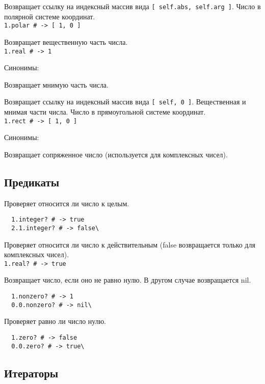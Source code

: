 \begin{methodlist}
  Возвращает ссылку на индексный массив вида \verb![ self.abs, self.arg ]!. Число в полярной системе координат.
  \\\verb!1.polar # -> [ 1, 0 ]!

  Возвращает вещественную часть числа.
  \\\verb!1.real # -> 1!

  Синонимы: 

  Возвращает мнимую часть числа.

  Возвращает ссылку на индексный массив вида \verb![ self, 0 ]!. Вещественная и мнимая части числа. Число в прямоугольной системе координат.
  \\\verb!1.rect # -> [ 1, 0 ]!

  Синонимы: 

  Возвращает сопряженное число (используется для комплексных чисел).
\end{methodlist}

\subsection*{Предикаты}

\begin{methodlist}
  Проверяет относится ли число к целым.
  \begin{verbatim}
  1.integer? # -> true
  2.1.integer? # -> false\
  \end{verbatim}

  Проверяет относится ли число к действительным (false возвращается только для комплексных чисел).
  \\\verb!1.real? # -> true!

  Возвращает число, если оно не равно нулю. В другом случае возвращается nil.
  \begin{verbatim}
  1.nonzero? # -> 1
  0.0.nonzero? # -> nil\
  \end{verbatim}

  Проверяет равно ли число нулю.
  \begin{verbatim}
  1.zero? # -> false
  0.0.zero? # -> true\
  \end{verbatim}
\end{methodlist}

\subsection*{Итераторы}

